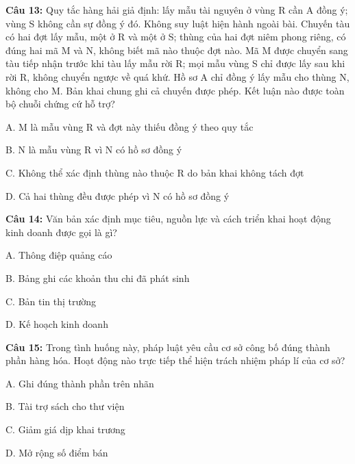 \documentclass[12pt,a4paper]{article}
\begin{document}
\par\noindent\begin{minipage}{\linewidth}
\noindent\textbf{Câu 13:} Quy tắc hàng hải giả định: lấy mẫu tài nguyên ở vùng R cần A đồng ý; vùng S không cần sự đồng ý đó. Không suy luật hiện hành ngoài bài. Chuyến tàu có hai đợt lấy mẫu, một ở R và một ở S; thùng của hai đợt niêm phong riêng, có đúng hai mã M và N, không biết mã nào thuộc đợt nào. Mã M được chuyển sang tàu tiếp nhận trước khi tàu lấy mẫu rời R; mọi mẫu vùng S chỉ được lấy sau khi rời R, không chuyển ngược về quá khứ. Hồ sơ A chỉ đồng ý lấy mẫu cho thùng N, không cho M. Bản khai chung ghi cả chuyến được phép. Kết luận nào được toàn bộ chuỗi chứng cứ hỗ trợ?\par
\noindent A. M là mẫu vùng R và đợt này thiếu đồng ý theo quy tắc\par
\noindent B. N là mẫu vùng R vì N có hồ sơ đồng ý\par
\noindent C. Không thể xác định thùng nào thuộc R do bản khai không tách đợt\par
\noindent D. Cả hai thùng đều được phép vì N có hồ sơ đồng ý\par
\end{minipage}\par\vspace{0.12cm}

\par\noindent\begin{minipage}{\linewidth}
\noindent\textbf{Câu 14:} Văn bản xác định mục tiêu, nguồn lực và cách triển khai hoạt động kinh doanh được gọi là gì?\par
\noindent A. Thông điệp quảng cáo\par
\noindent B. Bảng ghi các khoản thu chi đã phát sinh\par
\noindent C. Bản tin thị trường\par
\noindent D. Kế hoạch kinh doanh\par
\end{minipage}\par\vspace{0.12cm}

\par\noindent\begin{minipage}{\linewidth}
\noindent\textbf{Câu 15:} Trong tình huống này, pháp luật yêu cầu cơ sở công bố đúng thành phần hàng hóa. Hoạt động nào trực tiếp thể hiện trách nhiệm pháp lí của cơ sở?\par
\noindent A. Ghi đúng thành phần trên nhãn\par
\noindent B. Tài trợ sách cho thư viện\par
\noindent C. Giảm giá dịp khai trương\par
\noindent D. Mở rộng số điểm bán\par
\end{minipage}\par\vspace{0.12cm}
\end{document}
